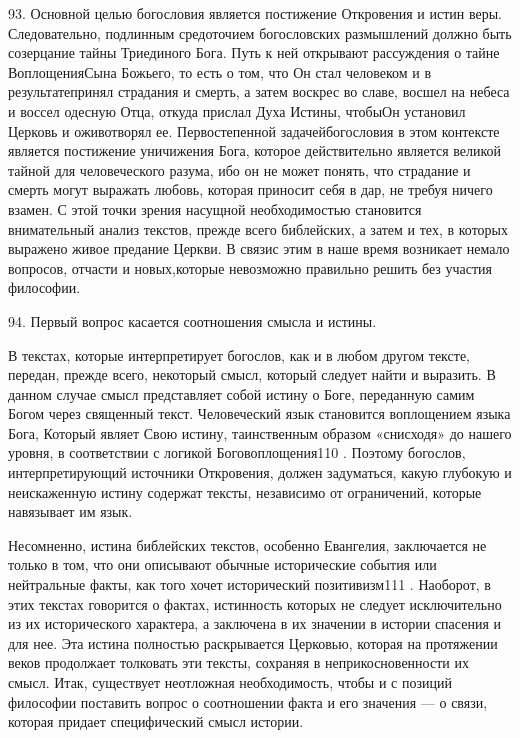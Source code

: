 \documentclass[a5paper,10pt]{article}
\begin{document}
93. Основной целью богословия является постижение Откровения и истин веры.
Следовательно, подлинным средоточием богословских размышлений должно быть
созерцание тайны Триединого Бога. Путь к ней открывают рассуждения о тайне
ВоплощенияСына Божьего, то есть о том, что Он стал человеком и в
результатепринял страдания и смерть, а затем воскрес во славе, восшел на небеса
и воссел одесную Отца, откуда прислал Духа Истины, чтобыОн установил Церковь и
оживотворял ее. Первостепенной задачейбогословия в этом контексте является
постижение уничижения Бога, которое действительно является великой тайной для
человеческого разума, ибо он не может понять, что страдание и смерть могут
выражать любовь, которая приносит себя в дар, не требуя ничего взамен. С этой
точки зрения насущной необходимостью становится внимательный анализ текстов,
прежде всего библейских, а затем и тех, в которых выражено живое предание
Церкви. В связис этим в наше время возникает немало вопросов, отчасти и
новых,которые невозможно правильно решить без участия философии.

94. Первый вопрос касается соотношения смысла и истины.

В текстах, которые интерпретирует богослов, как и в любом другом тексте,
передан, прежде всего, некоторый смысл, который следует найти и выразить. В
данном случае смысл представляет собой истину о Боге, переданную самим Богом
через священный текст. Человеческий язык становится воплощением языка Бога,
Который являет Свою истину, таинственным образом «снисходя» до нашего уровня, в
соответствии с логикой Боговоплощения110 . Поэтому богослов, интерпретирующий
источники Откровения, должен задуматься, какую глубокую и неискаженную истину
содержат тексты, независимо от ограничений, которые навязывает им язык.

Несомненно, истина библейских текстов, особенно Евангелия, заключается не
только в том, что они описывают обычные исторические события или нейтральные
факты, как того хочет исторический позитивизм111 . Наоборот, в этих текстах
говорится о фактах, истинность которых не следует исключительно из их
исторического характера, а заключена в их значении в истории спасения и для
нее. Эта истина полностью раскрывается Церковью, которая на протяжении веков
продолжает толковать эти тексты, сохраняя в неприкосновенности их смысл. Итак,
существует неотложная необходимость, чтобы и с позиций философии поставить
вопрос о соотношении факта и его значения — о связи, которая придает
специфический смысл истории.
\end{document}
